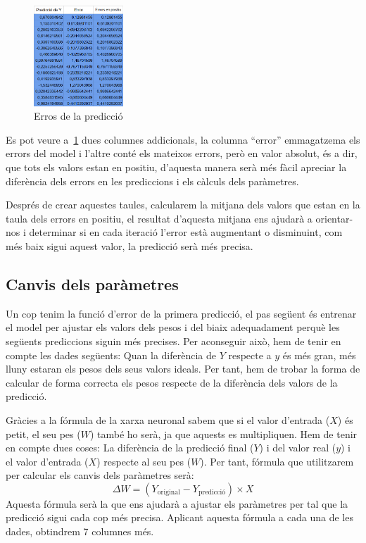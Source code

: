 \begin{figure}[h!]
    \centering
    \includegraphics[width=0.3\textwidth]{./figures/Errors.png}
    \caption{Erros de la predicció}
    \label{f:errors}
\end{figure}

Es pot veure a~\ref{f:errors} dues columnes addicionals, la columna ``error'' emmagatzema els errors del model i l'altre conté els mateixos errors, però en valor absolut, és a dir, que tots els valors estan en positiu, d'aquesta manera serà més fàcil apreciar la diferència dels errors en les prediccions i els càlculs dels paràmetres.

Després de crear aquestes taules, calcularem la mitjana dels valors que estan en la taula dels errors en positiu, el resultat d'aquesta mitjana ens ajudarà a orientar-nos i determinar si en cada iteració l'error està augmentant o disminuint, com més baix sigui aquest valor, la predicció serà més precisa.

\subsection{Canvis dels paràmetres}
Un cop tenim la funció d'error de la primera predicció, el pas següent és entrenar el model per ajustar els valors dels pesos i del biaix adequadament perquè les següents prediccions siguin més precises.
Per aconseguir això, hem de tenir en compte les dades següents: Quan la diferència de $Y$ respecte a $y$ és més gran, més lluny estaran els pesos dels seus valors ideals. Per tant, hem de trobar la forma de calcular de forma correcta els pesos respecte de la diferència dels valors de la predicció.

Gràcies a la fórmula de la xarxa neuronal sabem que si el valor d'entrada ($X$) és petit, el seu pes ($W$) també ho serà, ja que aquests es multipliquen. Hem de tenir en compte dues coses: La diferència de la predicció final ($Y$) i del valor real ($y$) i el valor d'entrada ($X$) respecte al seu pes ($W$). Per tant, fórmula que utilitzarem per calcular els canvis dels paràmetres serà:
$$\Delta W = (Y_{\text{original}} - Y_{\text{predicció}}) \times X$$
Aquesta fórmula serà la que ens ajudarà a ajustar els paràmetres per tal que la predicció sigui cada cop més precisa. Aplicant aquesta fórmula a cada una de les dades, obtindrem 7 columnes més.


